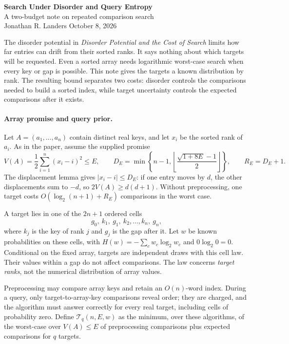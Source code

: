 \documentclass[11pt,letterpaper]{article}
\begin{document}
\begin{center}
{\Large\bfseries Search Under Disorder and Query Entropy}\\[2pt]
{\small A two-budget note on repeated comparison search}\\[5pt]
Jonathan R. Landers \qquad October 8, 2026
\end{center}

The disorder potential in \emph{Disorder Potential and the Cost of Search}
limits how far entries can drift from their sorted ranks. It says nothing
about which targets will be requested. Even a sorted array needs logarithmic
worst-case search when every key or gap is possible. This note gives the
targets a known distribution by rank. The resulting bound separates two
costs: disorder controls the comparisons needed to build a sorted index,
while target uncertainty controls the expected comparisons after it exists.

\paragraph{Array promise and query prior.}
Let $A=(a_1,\ldots,a_n)$ contain distinct real keys, and let $x_i$ be
the sorted rank of $a_i$. As in the paper, assume the supplied promise
\[
 V(A)=\frac12\sum_{i=1}^n(x_i-i)^2\le E,\qquad
 D_E=\min\left\{n-1,
 \left\lfloor\frac{\sqrt{1+8E}-1}{2}\right\rfloor\right\},
 \qquad R_E=D_E+1.
\]
The displacement lemma gives $|x_i-i|\le D_E$: if one entry moves by
$d$, the other displacements sum to $-d$, so $2V(A)\ge d(d+1)$.
Without preprocessing, one target costs
$O(\log_2(n+1)+R_E)$ comparisons in the worst case.

A target lies in one of the $2n+1$ ordered cells
\[
 g_0,\ k_1,\ g_1,\ k_2,\ldots,k_n,\ g_n,
\]
where $k_j$ is the key of rank $j$ and $g_j$ is the gap after it.
Let $w$ be known probabilities on these cells, with
$H(w)=-\sum_c w_c\log_2 w_c$ and $0\log_2 0=0$.
Conditional on the fixed array, targets are independent draws with
this cell law. Their values within a gap do not affect comparisons.
The law concerns \emph{target ranks}, not the numerical distribution of
array values.

Preprocessing may compare array keys and retain an $O(n)$-word index.
During a query, only target-to-array-key comparisons reveal order; they are
charged, and the algorithm must answer correctly for every real target,
including cells of probability zero. Define $\mathcal T_q(n,E,w)$ as the
minimum, over these algorithms, of the worst-case over $V(A)\le E$ of
preprocessing comparisons plus expected comparisons for $q$ targets.
\end{document}
